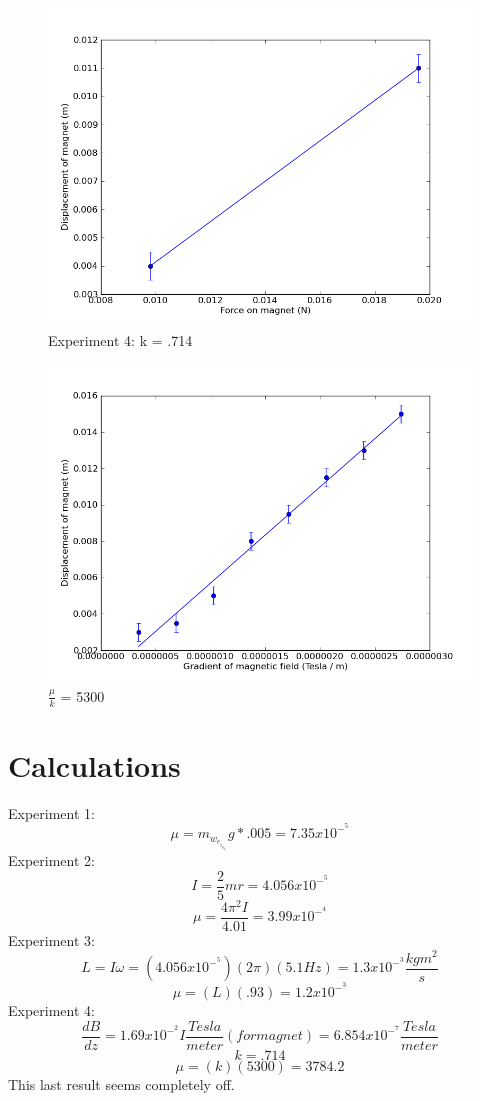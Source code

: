 \documentclass[12pt]{article}
\begin{document}
\begin{figure}[H]
\centering
\hspace{-0.0in}\includegraphics[scale=0.50]{Plot5.png}
\caption{Experiment 4: k = .714 \label{fig:setup}}
\end{figure}

\begin{figure}[H]
\centering
\hspace{-0.0in}\includegraphics[scale=0.50]{Plot6.png}
\caption{$\frac{\mu}{k}$ = 5300 \label{fig:setup}}
\end{figure}

\section{Calculations}
\indent \indent Experiment 1:
\[\mu = m_w_e_i_g_h_tg*.005 = 7.35 x 10^-^5 \]
\indent Experiment 2:
\[I = \frac{2}{5} m r = 4.056 x 10^-^5 \]
\[ \mu = \frac{4\pi^2I}{4.01} = 3.99 x 10^-^4 \]
\indent Experiment 3:
\[L = I\omega = (4.056 x 10^-^5)(2\pi)(5.1 Hz) = 1.3 x 10^-^3 \frac{kg m^2}{s} \]
\[ \mu = (L)(.93) = 1.2 x 10^-^3 \]
\indent Experiment 4:
\[ \frac{dB}{dz} = 1.69 x 10^-^2 I \frac{Tesla}{meter} (for magnet) = 6.854 x 10^-^7 \frac{Tesla}{meter} \]
\[ k = .714 \]
\[ \mu = (k)(5300) = 3784.2 \]
\indent This last result seems completely off.
\end{document}
